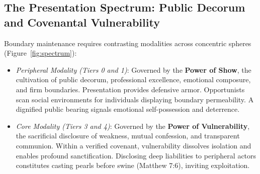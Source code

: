 \documentclass[11pt,twocolumn]{article}
\begin{document}
\subsection{The Presentation Spectrum: Public Decorum and Covenantal Vulnerability}
Boundary maintenance requires contrasting modalities across concentric spheres (Figure~\ref{fig:spectrum}):
\begin{itemize}
    \item \textit{Peripheral Modality (Tiers 0 and 1)}: Governed by the \textbf{Power of Show}, the cultivation of public decorum, professional excellence, emotional composure, and firm boundaries. Presentation provides defensive armor. Opportunists scan social environments for individuals displaying boundary permeability. A dignified public bearing signals emotional self-possession and deterrence.
    \item \textit{Core Modality (Tiers 3 and 4)}: Governed by the \textbf{Power of Vulnerability}, the sacrificial disclosure of weakness, mutual confession, and transparent communion. Within a verified covenant, vulnerability dissolves isolation and enables profound sanctification. Disclosing deep liabilities to peripheral actors constitutes casting pearls before swine (Matthew 7:6), inviting exploitation.
\end{itemize}
\end{document}
